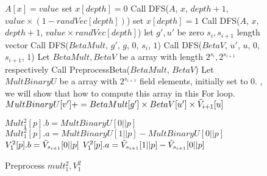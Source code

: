 {{{	\begin{figure}[p]
		\begin{algorithm}[H]
			\label{alg::parttwo}
			\caption{Preprocess $mult_1^2, V_1^2$}
			\begin{algorithmic}[1]
				\State $A[x]=value$
				\Else
				\State set $x[depth]=0$
				\State Call DFS($A$, $x$, $depth + 1$, $value \times (1-randVec[depth])$)
				\State set $x[depth]=1$
				\State Call DFS($A$, $x$, $depth + 1$, $value \times randVec[depth]$)
				\EndIf
				\EndProcedure
				\State let $g', u'$ be zero $s_{i}, s_{i+1}$ length vector
				\State Call {\sf DFS}($BetaMult$, $g'$, $g$, $0$, $s_{i}$, $1$)
				\State Call {\sf DFS}($BetaV$, $u'$, $u$, $0$, $s_{i + 1}$, $1$)
				\EndProcedure
				\State Let $BetaMult, BetaV$ be a array with length $2^{s_{i}}, 2^{s_{i+1}}$ respectively
				\State Call {\sf PreprocessBeta}($BetaMult$, $BetaV$)
				\State Let $MultBinaryU$ be a array with $2^{s_{i+1}}$ field elements, initially set to $0$.
				, we will show that how to compute this array in this For loop.
				\State $MultBinaryU[v'] += BetaMult[g'] \times BetaV[u'] \times \tilde{V}_{i+1}[u]$
				\EndFor
				\EndFor
				
				\State $Mult_1^2[p].b = MultBinaryU[0||p]$
				\State $Mult_1^2[p].a = MultBinaryU[1||p]-MultBinaryU[0||p]$
				\State $V_1^2[p].b = \tilde{V}_{s_{i+1}}[0||p]$
				\State $V_1^2[p].a = \tilde{V}_{s_{i+1}}[1||p]-\tilde{V}_{s_{i+1}}[0||p]$
				\EndFor
				\EndProcedure
			\end{algorithmic}
		\end{algorithm}
	\end{figure}
	
}}}
